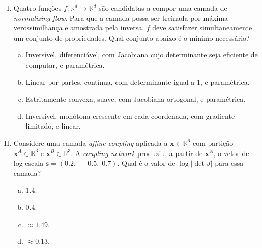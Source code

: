 \documentclass{dlproblemset}
\begin{document}
\begin{enumerate}[I)]

    \item Quatro funções $f : \mathbb{R}^d \to \mathbb{R}^d$ são candidatas a compor uma camada de \textit{normalizing flow}. Para que a camada possa ser treinada por máxima verossimilhança e amostrada pela inversa, $f$ deve satisfazer simultaneamente um conjunto de propriedades. Qual conjunto abaixo é o mínimo necessário?
    \begin{enumerate}[(a)]
        \item Inversível, diferenciável, com Jacobiana cujo determinante seja eficiente de computar, e paramétrica.
        \item Linear por partes, contínua, com determinante igual a 1, e paramétrica.
        \item Estritamente convexa, suave, com Jacobiana ortogonal, e paramétrica.
        \item Inversível, monótona crescente em cada coordenada, com gradiente limitado, e linear.
    \end{enumerate}

    \item Considere uma camada \textit{affine coupling} aplicada a $\mathbf{x} \in \mathbb{R}^{6}$ com partição $\mathbf{x}^{A} \in \mathbb{R}^{3}$ e $\mathbf{x}^{B} \in \mathbb{R}^{3}$. A \textit{coupling network} produziu, a partir de $\mathbf{x}^{A}$, o vetor de log-escala $\mathbf{s} = (0.2,\; -0.5,\; 0.7)$. Qual é o valor de $\log\left|\det J\right|$ para essa camada?
    \begin{enumerate}[(a)]
        \item $1.4$.
        \item $0.4$.
        \item $\approx 1.49$.
        \item $\approx 0.13$.
    \end{enumerate}


\end{enumerate}
\end{document}
